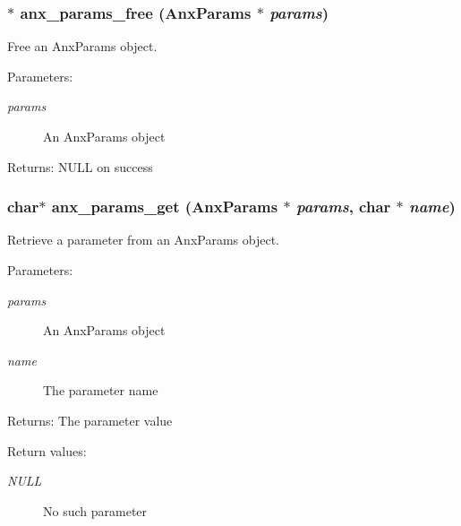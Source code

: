 \subsubsection{$\ast$ anx\_\-params\_\-free ({\bf Anx\-Params} $\ast$ {\em params})}\label{anx__params_8h_a13}


Free an Anx\-Params object. 

\begin{Desc}
\item[Parameters:]
\begin{description}
\item[{\em params}]An Anx\-Params object \end{description}
\end{Desc}
\begin{Desc}
\item[Returns:]NULL on success \end{Desc}
\subsubsection{\setlength{\rightskip}{0pt plus 5cm}char$\ast$ anx\_\-params\_\-get ({\bf Anx\-Params} $\ast$ {\em params}, char $\ast$ {\em name})}\label{anx__params_8h_a7}


Retrieve a parameter from an Anx\-Params object. 

\begin{Desc}
\item[Parameters:]
\begin{description}
\item[{\em params}]An Anx\-Params object \item[{\em name}]The parameter name \end{description}
\end{Desc}
\begin{Desc}
\item[Returns:]The parameter value \end{Desc}
\begin{Desc}
\item[Return values:]
\begin{description}
\item[{\em NULL}]No such parameter \end{description}
\end{Desc}
